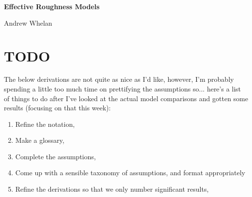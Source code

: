 \documentclass{article}
\begin{document}
\renewcommand{\thesection}{\Alph{section}}
\begin{titlepage}
   \centering
   \vspace*{\fill}  %

   {\Huge\bfseries Effective Roughness Models \par}
   \vspace{1cm}

   {\Large Andrew Whelan \par}
   \vspace{0.5cm}

   {\large \date{\today} \par}

   \vspace*{\fill}  %
\end{titlepage}

\section*{TODO}
The below derivations are not quite as nice as I'd like, however, I'm probably
spending a little too much time on prettifying the assumptions so... here's a list of
things to do after I've looked at the actual model comparisons and gotten some
results (focusing on that this week):
\begin{enumerate}
   \item Refine the notation,
   \item Make a glossary,
   \item Complete the assumptions,
   \item Come up with a sensible taxonomy of assumptions, and format appropriately
   \item Refine the derivations so that we only number significant results,
\end{enumerate}

\newpage
\setcounter{section}{14} %
\setcounter{subsection}{-1}
\setcounter{equation}{0}
\end{document}

